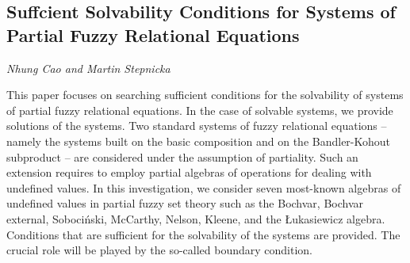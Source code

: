 \documentclass[../booklet.tex]{subfiles}
\begin{document}
\subsection[Suffcient Solvability Conditions for Systems of Partial Fuzzy Relational Equations. {\it Nhung Cao and Martin Stepnicka}]{Suffcient Solvability Conditions for Systems of Partial Fuzzy Relational Equations}
 

\begin{center}
  {\it Nhung Cao and Martin Stepnicka}
\end{center}

\vskip 0.8cm


This paper focuses on searching sufficient conditions for the solvability of systems of partial fuzzy relational equations. In the case of solvable systems, we provide solutions of the systems. Two standard systems of fuzzy relational equations -- namely the systems built on the basic composition and on the Bandler-Kohout subproduct -- are considered under the assumption of partiality. Such an extension requires to employ partial algebras of operations for dealing with undefined values. In this investigation, we consider seven most-known algebras of undefined values in partial fuzzy set theory such as the Bochvar, Bochvar external, Soboci\'{n}ski, McCarthy, Nelson, Kleene, and the \L{}ukasiewicz algebra. Conditions that are sufficient for the solvability of the systems are provided. The crucial role will be played by the so-called  boundary condition.  

\end{document}
